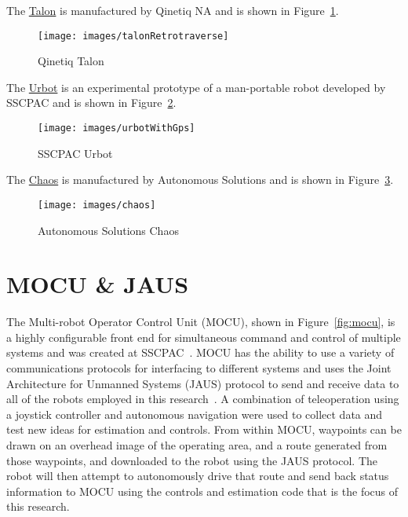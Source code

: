 The \href{http://www.foster-miller.com/lemming.htm}{Talon} is manufactured by Qinetiq NA and is shown in Figure~\ref{fig:talon}.

\begin{figure}[ht!]
\centering
\texttt{[image: images/talonRetrotraverse]}
\caption{Qinetiq Talon}%
\label{fig:talon}
\end{figure}

The \href{http://www.spawar.navy.mil/robots/land/mprs/mprs.html}{Urbot} is an experimental prototype of a man-portable robot developed by SSCPAC and is shown in Figure~\ref{fig:urbot}.

\begin{figure}[ht!]
\centering
\texttt{[image: images/urbotWithGps]}
\caption{SSCPAC Urbot}%
\label{fig:urbot}
\end{figure}

The \href{http://www.autonomoussolutions.com/products/chaos.php}{Chaos} is manufactured by Autonomous Solutions and is shown in Figure~\ref{fig:chaos}.

\begin{figure}[ht!]
\centering
\texttt{[image: images/chaos]}
\caption{Autonomous Solutions Chaos}%
\label{fig:chaos}
\end{figure}

\section{MOCU \& JAUS}%
\label{sec:mocujaus}
The Multi-robot Operator Control Unit (MOCU), shown in Figure~\ref{fig:mocu}, is a highly configurable front end for simultaneous command and control of multiple systems and was created at SSCPAC~\cite{PowellMOCU08}.
MOCU has the ability to use a variety of communications protocols for interfacing to different systems and uses the Joint Architecture for Unmanned Systems (JAUS) protocol to send and receive data to all of the robots employed in this research~\cite{RoweJAUS08}.
A combination of teleoperation using a joystick controller and autonomous navigation were used to collect data and test new ideas for estimation and controls.
From within MOCU, waypoints can be drawn on an overhead image of the operating area, and a route generated from those waypoints, and downloaded to the robot using the JAUS protocol.
The robot will then attempt to autonomously drive that route and send back status information to MOCU using the controls and estimation code that is the focus of this research.


